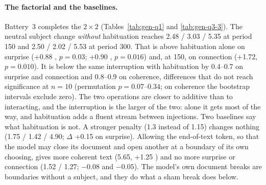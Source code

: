 \paragraph{The factorial and the baselines.} Battery~3 completes the
$2\times2$ (Tables~\ref{tab:gen-q1} and \ref{tab:gen-q3-3}). The neutral
subject change \emph{without} habituation reaches 2.48 / 3.03 / 5.35 at
period 150 and 2.50 / 2.02 / 5.53 at period 300. That is above habituation
alone on surprise (+0.88 , $p=0.03$; +0.90
, $p=0.016$) and, at 150, on connection (+1.72,
$p=0.010$). It is below the same interruption with habituation by 0.4--0.7
on surprise and connection and 0.8--0.9 on coherence, differences that do
not reach significance at $n=10$ (permutation $p=0.07$--$0.34$; on coherence the
bootstrap intervals exclude zero). The two operations are closer to additive
than to interacting, and the interruption is the larger of the two: alone it
gets most of the way, and habituation adds a fluent stream between
injections. Two baselines say what habituation is not. A stronger penalty
(1.3 instead of 1.15) changes nothing (1.75 / 1.42 / 4.90; $\Delta$ +0.15
 on surprise). Allowing the end-of-text token, so that the
model may close its document and open another at a boundary of its own
choosing, gives more coherent text (5.65, +1.25 ) and no
more surprise or connection (1.52 / 1.27; $-0.08$ and $-0.05$). The model's own
document breaks are boundaries without a subject, and they do what a sham
break does below.

